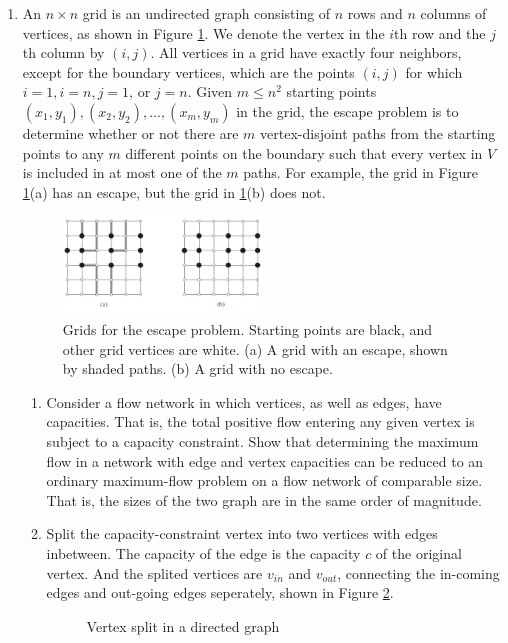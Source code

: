 \documentclass[12pt,a4paper]{article}
\makeatletter
\newtheorem*{solution}{Solution}
\theoremstyle{definition}
\renewenvironment{solution}[1][Solution] {\par\pushQED{\qed}\normalfont\topsep6\p@\@plus6\p@\relax\trivlist\item[\hskip\labelsep\bfseries#1\@addpunct{.}]\ignorespaces}{\popQED\endtrivlist\@endpefalse} \makeatother
\makeatother
\begin{document}
\begin{enumerate}
	\item An $n\times n$ grid is an undirected graph consisting of $n$ rows and $n$ columns of vertices, as shown in Figure \ref{Fig-EscapeProblem}. We denote the vertex in the $i$th row and the $j$th column by $(i,j)$. All vertices in a grid have exactly four neighbors, except for the boundary vertices, which are the points $(i,j)$ for which $i = 1, i = n, j = 1$, or $j = n$.
    Given $m\leqslant n^2$ starting points $(x_1,y_1), (x_2, y_2), ... , (x_m, y_m)$ in the grid, the escape problem is to determine whether or not there are $m$ vertex-disjoint paths from the starting points to any $m$ different points on the boundary such that every vertex in $V$ is included in at most one of the $m$ paths. For example, the grid in Figure \ref{Fig-EscapeProblem}(a) has an escape, but the grid in \ref{Fig-EscapeProblem}(b) does not.
    \begin{figure}[!htbp]
	\centering
	\includegraphics[width=0.5\textwidth]{Fig-EscapeProblem.pdf}
	\caption{Grids for the escape problem. Starting points are black, and other grid vertices are white. (a) A grid with an escape, shown by shaded paths. (b) A grid with no escape.}
	\label{Fig-EscapeProblem}
	\end{figure}
    \begin{enumerate}
        \item Consider a flow network in which vertices, as well as edges, have capacities. That is, the total positive flow entering any given vertex is subject to a capacity constraint. Show that determining the maximum flow in a network with edge and vertex capacities can be reduced to an ordinary maximum-flow problem on a flow network of comparable size. That is, the sizes of the two graph are in the same order of magnitude.
        \begin{solution}
			Split the capacity-constraint vertex into two vertices with edges inbetween. The capacity of the edge is the capacity $c$ of the original vertex. And the splited vertices are $v_{in}$ and $v_{out}$, connecting the in-coming edges and out-going edges seperately, shown in Figure \ref{fig:vdir}.

			\begin{figure}[h]
				\centering
				
				\caption{Vertex split in a directed graph}
				\label{fig:vdir}
			\end{figure}


\end{solution}
\end{enumerate}
\end{enumerate}
\end{document}

